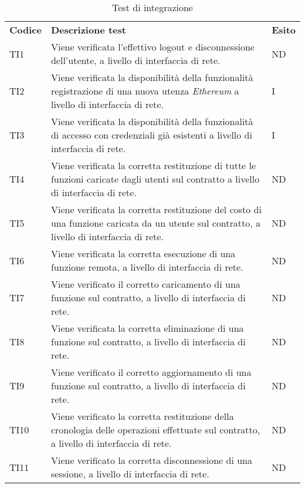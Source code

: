 \begin{longtable}{|C{1.5cm}|C{10cm}|C{1.5cm}|}

	\caption{Test di integrazione}\\
	\hline

	\textbf{Codice} & \textbf{Descrizione test}  & \textbf{Esito}
	\tabularnewline
	\endfirsthead
	TI1 &
	Viene verificata l'effettivo logout e disconnessione dell'utente, a livello di interfaccia di rete.  &
	ND \\

	TI2 &
	Viene verificata la disponibilità della funzionalità registrazione di una nuova utenza \textit{Ethereum\glo} a livello di interfaccia di rete.  &
	I \\

	TI3 &
	Viene verificata la disponibilità della funzionalità di accesso con credenziali già esistenti a livello di interfaccia di rete.  &
	I \\

	TI4 &
	Viene verificata la corretta restituzione di tutte le funzioni caricate dagli utenti sul contratto a livello di interfaccia di rete.  &
	ND \\

	TI5 &
	Viene verificata la corretta restituzione del costo di una funzione caricata da un utente sul contratto, a livello di interfaccia di rete.  &
	ND \\

	TI6 &
	Viene verificata la corretta esecuzione di una funzione remota, a livello di interfaccia di rete.  &
	ND \\

	TI7 &
	Viene verificato il corretto caricamento di una funzione sul contratto, a livello di interfaccia di rete.  &
	ND \\

	TI8 &
	Viene verificata la corretta eliminazione di una funzione sul contratto, a livello di interfaccia di rete.  &
	ND \\

	TI9 &
	Viene verificato il corretto aggiornamento di una funzione sul contratto, a livello di interfaccia di rete.  &
	ND \\

	TI10 &
	Viene verificato la corretta restituzione della cronologia delle operazioni effettuate sul contratto, a livello di interfaccia di rete.  &
	ND \\

	TI11 &
	Viene verificato la corretta disconnessione di una sessione, a livello di interfaccia di rete.  &
	ND \\


\end{longtable}
